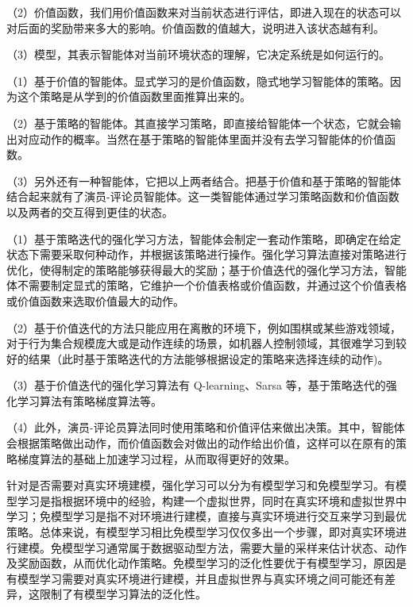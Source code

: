 （2）价值函数，我们用价值函数来对当前状态进行评估，即进入现在的状态可以对后面的奖励带来多大的影响。价值函数的值越大，说明进入该状态越有利。
  
（3）模型，其表示智能体对当前环境状态的理解，它决定系统是如何运行的。

  
（1）基于价值的智能体。显式学习的是价值函数，隐式地学习智能体的策略。因为这个策略是从学到的价值函数里面推算出来的。
  
（2）基于策略的智能体。其直接学习策略，即直接给智能体一个状态，它就会输出对应动作的概率。当然在基于策略的智能体里面并没有去学习智能体的价值函数。
  
（3）另外还有一种智能体，它把以上两者结合。把基于价值和基于策略的智能体结合起来就有了演员-评论员智能体。这一类智能体通过学习策略函数和价值函数以及两者的交互得到更佳的状态。


（1）基于策略迭代的强化学习方法，智能体会制定一套动作策略，即确定在给定状态下需要采取何种动作，并根据该策略进行操作。强化学习算法直接对策略进行优化，使得制定的策略能够获得最大的奖励；基于价值迭代的强化学习方法，智能体不需要制定显式的策略，它维护一个价值表格或价值函数，并通过这个价值表格或价值函数来选取价值最大的动作。
  
（2）基于价值迭代的方法只能应用在离散的环境下，例如围棋或某些游戏领域，对于行为集合规模庞大或是动作连续的场景，如机器人控制领域，其很难学习到较好的结果（此时基于策略迭代的方法能够根据设定的策略来选择连续的动作)。
  
（3）基于价值迭代的强化学习算法有 Q-learning、Sarsa 等，基于策略迭代的强化学习算法有策略梯度算法等。
    
（4）此外，演员-评论员算法同时使用策略和价值评估来做出决策。其中，智能体会根据策略做出动作，而价值函数会对做出的动作给出价值，这样可以在原有的策略梯度算法的基础上加速学习过程，从而取得更好的效果。

    
针对是否需要对真实环境建模，强化学习可以分为有模型学习和免模型学习。有模型学习是指根据环境中的经验，构建一个虚拟世界，同时在真实环境和虚拟世界中学习；免模型学习是指不对环境进行建模，直接与真实环境进行交互来学习到最优策略。总体来说，有模型学习相比免模型学习仅仅多出一个步骤，即对真实环境进行建模。免模型学习通常属于数据驱动型方法，需要大量的采样来估计状态、动作及奖励函数，从而优化动作策略。免模型学习的泛化性要优于有模型学习，原因是有模型学习需要对真实环境进行建模，并且虚拟世界与真实环境之间可能还有差异，这限制了有模型学习算法的泛化性。

    
